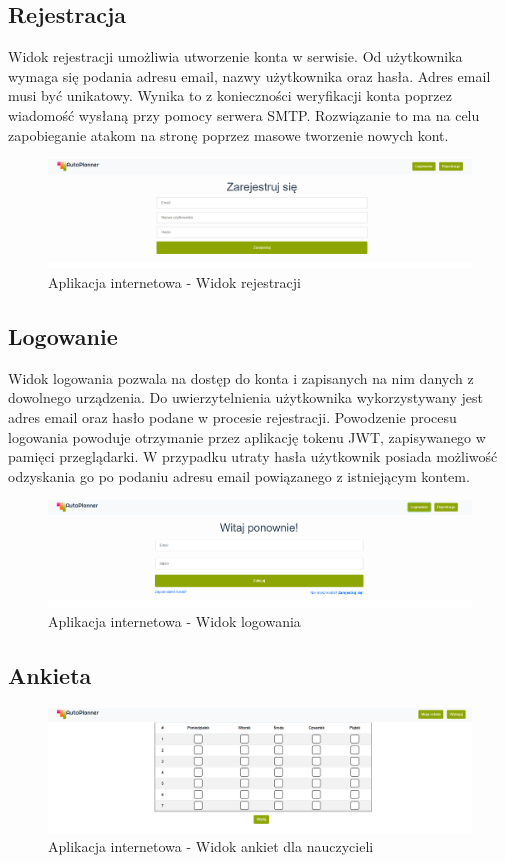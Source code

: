 \subsection{Rejestracja}
Widok rejestracji umożliwia utworzenie konta w serwisie. Od użytkownika wymaga się podania adresu email, nazwy użytkownika oraz hasła. Adres email musi być unikatowy. Wynika to z konieczności weryfikacji konta poprzez wiadomość wysłaną przy pomocy serwera SMTP. Rozwiązanie to ma na celu zapobieganie atakom na stronę poprzez masowe tworzenie nowych kont. 
\begin{figure}[t]
\centering\includegraphics[width=\textwidth]{figures/register}
\caption{Aplikacja internetowa - Widok rejestracji}\label{rys:register}
\end{figure}
\subsection{Logowanie}
Widok logowania pozwala na dostęp do konta i zapisanych na nim danych z dowolnego urządzenia. Do uwierzytelnienia użytkownika wykorzystywany jest adres email oraz hasło podane w procesie rejestracji. Powodzenie procesu logowania powoduje otrzymanie przez aplikację tokenu JWT, zapisywanego w pamięci przeglądarki. W przypadku utraty hasła użytkownik posiada możliwość odzyskania go po podaniu adresu email powiązanego z istniejącym kontem.
\begin{figure}[t]
\centering\includegraphics[width=\textwidth]{figures/login}
\caption{Aplikacja internetowa - Widok logowania}\label{rys:login}
\end{figure}

\subsection{Ankieta}
\begin{figure}[t]
\centering\includegraphics[width=\textwidth]{figures/poll}
\caption{Aplikacja internetowa - Widok ankiet dla nauczycieli}\label{rys:poll}
\end{figure}
